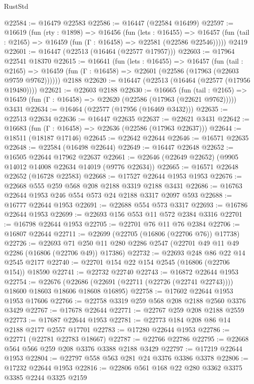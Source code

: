 \begin{lexlean}{RustStd}
\begin{coremodule}
@22584 := @16479 @22583
@22586 := @16447 (@22584 @16499)
@22597 := @16619
    (fun (rty : @1898) =>
    @16456
      (fun (lets : @16455) =>
      @16457 (fun (tail : @2165) => @16459 (fun (Γ : @16458) => @22581 (@22586 @22546)))))
    @2419
@22601 := @16447 (@22513 (@16464 (@22577 @17957)))
@22603 := @17964 @22541 @18370
@22615 := @16641
    (fun (lets : @16455) =>
    @16457
      (fun (tail : @2165) =>
      @16459 (fun (Γ : @16458) => @22601 (@22586 (@17963 (@22603 @9759 @9762))))))
    @2188
@22620 := @16447 (@22513 (@16464 (@22577 (@17956 @19480))))
@22621 := @22603 @2188
@22630 := @16665
    (fun (tail : @2165) => @16459 (fun (Γ : @16458) => @22620 (@22586 (@17963 (@22621 @9762)))))
    @3431
@22634 := @16464 (@22577 (@17956 (@16469 @3432)))
@22635 := @22513 @22634
@22636 := @16447 @22635
@22637 := @22621 @3431
@22642 := @16683 (fun (Γ : @16458) => @22636 (@22586 (@17963 @22637)))
@22644 := @18511 (@18187 @17146)
@22645 := @22642 @22644
@22646 := @16571 @22635
@22648 := @22584 (@16498 @22644)
@22649 := @16447 @22648
@22652 := @16505 @22644 @17962 @22637
@22661 := @22646 (@22649 @22652) (@9905 @14012 @14008 @22634 @14019 (@9776 @22634))
@22665 := @16571 @22648 @22652 (@16728 @22583)
@22668 := @17527 @22644 @1953 @1953
@22676 := @22668 @555 @259 @568 @208 @2188 @3319 @2188 @3431
@22686 := @16763 @22644 @1953 @246 @554 @573 @24 @2188 @3317 @2097 @593
@22688 := @16777 @22644 @1953
@22691 := @22688 @554 @573 @3317
@22693 := @16786 @22644 @1953
@22699 := @22693 @156 @553 @11 @572 @2384 @3316
@22701 := @16798 @22644 @1953
@22705 := @22701 @76 @11 @76 @2384
@22706 := @16807 @22644
@22711 := @22699 (@22705 (@16806 (@22706 @76)) @17738)
@22726 := @22693
    @71
    @250
    @11
    @280
    @2286
    @2547
    (@22701 @49 @11 @49 @2286 (@16806 (@22706 @49)) @17386)
@22732 := @22693 @248 @86 @22 @14 @2545 @2177
@22740 := @22701 @154 @22 @154 @2545 (@16806 (@22706 @154)) @18590
@22741 := @22732 @22740
@22743 := @16872 @22644 @1953
@22754 := @22676
    (@22686 (@22691 (@22711 (@22726 (@22741 @22743)))) @18600 @18603 @18606 @18608 @16895)
@22758 := @17602 @22644 @1953 @1953 @17606
@22766 := @22758 @3319 @259 @568 @208 @2188 @2560 @3376 @3429
@22767 := @17678 @22644
@22771 := @22767 @259 @208 @2188 @2559
@22773 := @17687 @22644 @1953
@22781 := @22773 @184 @208 @86 @14 @2188 @2177 @2557 @17701
@22783 := @17280 @22644 @1953
@22786 := @22771 (@22781 @22783 @18667)
@22787 := @22766 @22786
@22795 := @22668 @564 @566 @259 @208 @3376 @3388 @2188 @3429
@22797 := @17219 @22644 @1953
@22804 := @22797 @558 @563 @281 @24 @3376 @3386 @3378
@22806 := @17232 @22644 @1953
@22816 := @22806 @561 @168 @22 @280 @3362 @3375 @3385 @2244 @3325 @2159

\end{coremodule}
\end{lexlean}
